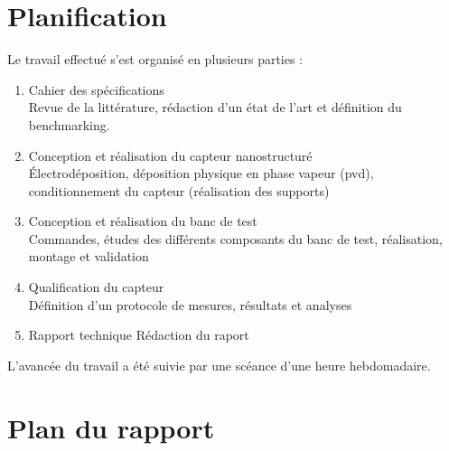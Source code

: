 \section{Planification}
Le travail effectué s'est organisé en plusieurs parties : \\
\begin{enumerate}
    \item Cahier des spécifications\\
          Revue de la littérature, rédaction d'un état de l'art et définition du benchmarking. \\
    \item Conception et réalisation du capteur nanostructuré\\
          Électrodéposition, déposition physique en phase vapeur (\gls{pvd}), conditionnement du capteur (réalisation des supports)\\
    \item Conception et réalisation du banc de test\\
          Commandes, études des différents composants du banc de test, réalisation, montage et validation\\
    \item Qualification du capteur\\
          Définition d'un protocole de mesures, résultats et analyses\\
    \item Rapport technique
          Rédaction du raport
\end{enumerate}
L'avancée du travail a été suivie par une scéance d'une heure hebdomadaire. 

\section{Plan du rapport}

